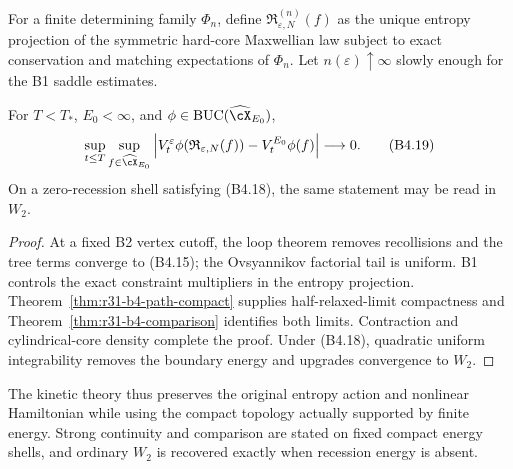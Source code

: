 For a finite determining family $\Phi_n$, define
$\mathfrak R_{\varepsilon,N}^{(n)}(f)$ as the unique entropy projection of the
symmetric hard-core Maxwellian law subject to exact conservation and matching
expectations of $\Phi_n$.  Let $n(\varepsilon)\uparrow\infty$ slowly enough for
the B1 saddle estimates.

\begin{theorem}
\label{thm:r31-b4-limit}
For $T<T_*$, $E_0<\infty$, and
$\phi\in\operatorname{BUC}(\widehat\cX_{E_0})$,
\[
 \sup_{t\le T}\sup_{f\in\widehat\cX_{E_0}}
 \left|V_t^\varepsilon\phi(
       \mathfrak R_{\varepsilon,N}(f))-V_t^{E_0}\phi(f)\right|
 \longrightarrow0.                                      \tag{B4.19}
\]
On a zero-recession shell satisfying (B4.18), the same statement may be read
in $W_2$.
\end{theorem}

\begin{proof}
At a fixed B2 vertex cutoff, the loop theorem removes recollisions and the
tree terms converge to (B4.15); the Ovsyannikov factorial tail is uniform.
B1 controls the exact constraint multipliers in the entropy projection.
Theorem~\ref{thm:r31-b4-path-compact} supplies half-relaxed-limit compactness
and Theorem~\ref{thm:r31-b4-comparison} identifies both limits.  Contraction
and cylindrical-core density complete the proof.  Under (B4.18), quadratic
uniform integrability removes the boundary energy and upgrades convergence to
$W_2$.
\end{proof}

The kinetic theory thus preserves the original entropy action and nonlinear
Hamiltonian while using the compact topology actually supported by finite
energy.  Strong continuity and comparison are stated on fixed compact energy
shells, and ordinary $W_2$ is recovered exactly when recession energy is
absent.
